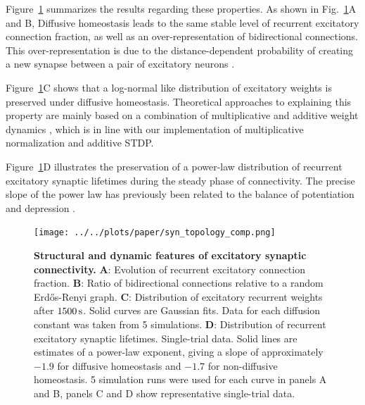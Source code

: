 \documentclass[10pt,letterpaper]{article}
\begin{document}
Figure~\ref{Syn_Topology_Features} summarizes the results regarding these properties. As shown in Fig.~\ref{Syn_Topology_Features}A and B, Diffusive homeostasis leads to the same stable level of recurrent excitatory connection fraction, as well as an over-representation of bidirectional connections. This over-representation is due to the distance-dependent probability of creating a new synapse between a pair of excitatory neurons \cite{SORN_Paper,Hoffmann_2017}.

Figure~\ref{Syn_Topology_Features}C shows that a log-normal like distribution of excitatory weights is preserved under diffusive homeostasis. 
Theoretical approaches to explaining this property are mainly based on a combination of multiplicative and additive weight dynamics \cite{Loewenstein_Spine_Sizes,Pengsheng_2013,Statman_Synapses_2014,Loewenstein_2015}, which
is in line with our implementation of multiplicative normalization and additive STDP.

Figure~\ref{Syn_Topology_Features}D illustrates the preservation of a power-law distribution of recurrent excitatory synaptic lifetimes during the steady phase of connectivity. The precise slope of the power law has previously been related to the balance of potentiation and depression \cite{SORN_Paper}.

\begin{figure}
\begin{center}
\texttt{[image: ../../plots/paper/syn\_topology\_comp.png]}
\end{center}
\caption{{\bf Structural and dynamic features of excitatory synaptic connectivity.} \textbf{A}: Evolution of recurrent excitatory connection fraction. \textbf{B}: Ratio of bidirectional connections relative to a random Erd\H{o}s-Renyi graph. \textbf{C}: Distribution of excitatory recurrent weights after $\rm 1500\, s$. Solid curves are Gaussian fits. Data for each diffusion constant was taken from 5 simulations. \textbf{D}: Distribution of recurrent excitatory synaptic lifetimes. Single-trial data. Solid lines are estimates of a power-law exponent, giving a slope of approximately $\mathrm{-1.9}$ for diffusive homeostasis and $\mathrm{-1.7}$ for non-diffusive homeostasis. 5 simulation runs were used for each curve in panels A and B, panels C and D show representative single-trial data.}
\label{Syn_Topology_Features}
\end{figure}
\end{document}
